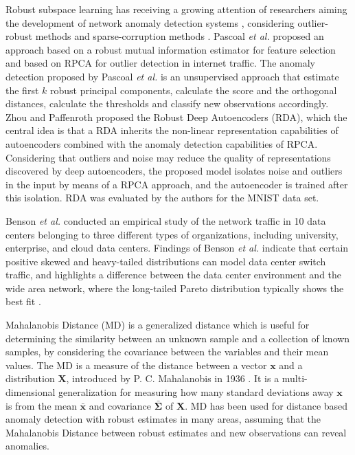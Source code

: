 Robust subspace learning has receiving a growing attention of researchers aiming the development of network anomaly detection systems \cite{rousseeuw1984mcd, rousseeuw1999fastmcd, hubert2005robpca,hubert2009robustskewed, pascoal2012robust, zhou2017anomaly}, considering outlier-robust methods and sparse-corruption methods \cite{lerman2018overview}. Pascoal \emph{et al.} \cite{pascoal2012robust} proposed an approach based on a robust mutual information estimator for feature selection and based on RPCA for outlier detection in internet traffic. The anomaly detection proposed by Pascoal \emph{et al.} is an unsupervised approach that estimate the first $k$ robust principal components, calculate the score and the orthogonal distances, calculate the thresholds and classify new observations accordingly. Zhou and Paffenroth \cite{zhou2017anomaly} proposed the Robust Deep Autoencoders (RDA), which the central idea is that a RDA inherits the non-linear representation capabilities of autoencoders combined with the anomaly detection capabilities of RPCA. Considering that outliers and noise may reduce the quality of representations discovered by deep autoencoders, the proposed model isolates noise and outliers in the input by means of a RPCA approach, and the autoencoder is trained after this isolation. RDA was evaluated by the authors for the MNIST data set.

Benson \emph{et al.} \cite{benson2010network} conducted an empirical study of the network traffic in 10 data centers belonging to three different types of organizations, including university, enterprise, and cloud data centers. Findings of Benson \emph{et al.} indicate that certain positive skewed and heavy-tailed distributions can model data center switch traffic, and highlights a difference between the data center environment and the wide area network, where the long-tailed Pareto distribution typically shows the best fit \cite{benson2010network}.

Mahalanobis Distance (MD) is a generalized distance which is useful for determining the similarity between an unknown sample and a collection of known samples, by considering the covariance between the variables and their mean values. The MD is a measure of the distance between a vector $\pmb{x}$ and a distribution $\pmb{X}$, introduced by P. C. Mahalanobis in 1936 \cite{mahalanobis1936md}. It is a multi-dimensional generalization for measuring how many standard deviations away $\pmb{x}$ is from the mean $\bar{\pmb{x}}$ and covariance $\bar{\pmb{\Sigma}}$ of $\pmb{X}$. MD has been used for distance based anomaly detection with robust estimates in many areas, assuming that the Mahalanobis Distance between robust estimates and new observations can reveal anomalies.

